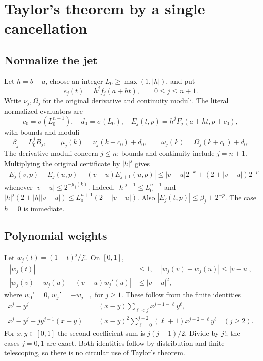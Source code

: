 \documentclass[11pt]{article}
\theoremstyle{definition}
\begin{document}
\section{Taylor's theorem by a single cancellation}\label{sec:taylor}

\subsection{Normalize the jet}

Let \(h=b-a\), choose an integer \(L_0\ge\max(1,|h|)\), and put
\[
 e_j(t)=h^j f_j(a+ht),\qquad 0\le j\le n+1.
\]
Write \(\nu_j,\Omega_j\) for the original derivative and continuity moduli.
The literal normalized evaluators are
\begin{equation}\label{eq:normalization}
 c_0=\sigma(L_0^{n+1}),\quad d_0=\sigma(L_0),\quad
 E_j(t,p)=h^j F_j(a+ht,p+c_0),
\end{equation}
with bounds and moduli
\[
 \beta_j=L_0^jB_j,\qquad
 \mu_j(k)=\nu_j(k+c_0)+d_0,\qquad
 \omega_j(k)=\Omega_j(k+c_0)+d_0.
\]
The derivative moduli concern \(j\le n\); bounds and continuity include
\(j=n+1\).
Multiplying the original certificate by \(|h|^j\) gives
\begin{align}
 |E_j(v,p)-E_j(u,p)-(v-u)E_{j+1}(u,p)|
 \le |v-u|2^{-k}+(2+|v-u|)2^{-p}\label{eq:normalizedderiv}
\end{align}
whenever \(|v-u|\le2^{-\mu_j(k)}\).
Indeed, \(|h|^{j+1}\le L_0^{n+1}\) and
\(|h|^j(2+|h||v-u|)\le L_0^{n+1}(2+|v-u|)\).
Also \(|E_j(t,p)|\le\beta_j+2^{-p}\). The case \(h=0\) is immediate.

\subsection{Polynomial weights}

Let \(w_j(t)=(1-t)^j/j!\). On \([0,1]\),
\begin{align}
 |w_j(t)|&\le1,\quad
 |w_j(v)-w_j(u)|\le|v-u|,\label{eq:weight1}\\
 |w_j(v)-w_j(u)-(v-u)w_j'(u)|
 &\le|v-u|^2,\label{eq:weight2}
\end{align}
where \(w_0'=0\), \(w_j'=-w_{j-1}\) for \(j\ge1\).
These follow from the finite identities
\begin{align}
 x^j-y^j&=(x-y)\sum_{\ell<j}x^{j-1-\ell}y^\ell,\label{eq:powerdiff}\\
 x^j-y^j-jy^{j-1}(x-y)
  &=(x-y)^2\sum_{\ell=0}^{j-2}(\ell+1)x^{j-2-\ell}y^\ell
       \quad(j\ge2).\label{eq:power2}
\end{align}
For \(x,y\in[0,1]\) the second coefficient sum is \(j(j-1)/2\).
Divide by \(j!\); the cases \(j=0,1\) are exact.
Both identities follow by distribution and finite telescoping, so there
is no circular use of Taylor's theorem.
\end{document}
